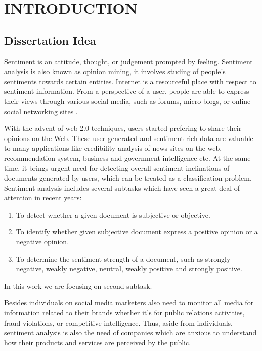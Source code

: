 \documentclass[oneside,a4paper,12pt]{pictreport}
\begin{document}
\chapter{INTRODUCTION}

\section{Dissertation Idea}

\par Sentiment is an attitude, thought, or judgement prompted by feeling. Sentiment analysis 
is also known as opinion mining, it involves studing of people’s sentiments towards 
certain entities. Internet is a resourceful place with respect to sentiment information. From a
perspective of a user, people are able to express their views through various social media,
such as forums, micro-blogs, or online social networking sites \cite{pang2008}.

\par With the advent of web 2.0 techniques,
users started prefering to share their opinions on the Web. These user-generated and 
sentiment-rich data are valuable to many applications like 
credibility analysis of news sites on the web, recommendation system, business and 
government intelligence etc. At the same time, it brings
urgent need for detecting overall sentiment inclinations of
documents generated by users, which can be treated as a
classification problem. Sentiment analysis includes several
subtasks which have seen a great deal of attention in recent years:
\begin{enumerate}
 \item To detect whether a given document is subjective or objective.
  \item To identify whether given subjective document express a positive opinion or a negative opinion.
  \item To determine the sentiment strength of a document,
such as strongly negative, weakly negative, neutral, weakly
positive and strongly positive.
\end{enumerate}

In this work we are focusing on second subtask.

\par Besides individuals on social media marketers also need to monitor all media for information related to their brands
whether it's for public relations activities, fraud violations, or competitive intelligence.
Thus, aside from individuals, sentiment analysis is also the need of companies which are anxious to understand how
their products and services are perceived by the public.
\end{document}
